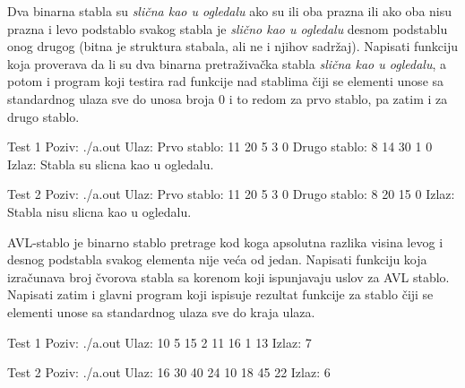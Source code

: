 \begin{Answer}[ref=712]
\end{Answer}



\begin{Exercise}[label=713, difficulty=1]
Dva binarna stabla su {\em slična kao u ogledalu} ako su ili oba prazna ili ako oba nisu prazna i levo podstablo svakog stabla je {\em slično kao u ogledalu} desnom podstablu onog drugog (bitna je struktura stabala, ali ne i njihov sadržaj). Napisati funkciju koja proverava da li su dva binarna pretraživačka stabla {\em slična kao u ogledalu}, a potom i program koji testira rad funkcije nad stablima čiji se elementi unose sa standardnog ulaza sve do unosa broja 0 i to redom za prvo stablo, pa zatim i za drugo stablo. 

\begin{miditest}
\begin{test}{Test 1}
Poziv: ./a.out
Ulaz: 
	Prvo stablo: 11 20 5 3 0
	Drugo stablo: 8 14 30 1 0
Izlaz: 
	Stabla su slicna kao u ogledalu.
\end{test}
\end{miditest}

\begin{miditest}
\begin{test}{Test 2}
Poziv: ./a.out
Ulaz: 
	Prvo stablo: 11 20 5 3 0
	Drugo stablo: 8 20 15 0
Izlaz: 
	Stabla nisu slicna kao u ogledalu.
\end{test}
\end{miditest}
\end{Exercise}

\begin{Answer}[ref=713]
\end{Answer}


\begin{Exercise}[label=714]
AVL-stablo je binarno stablo pretrage kod koga apsolutna razlika visina levog i desnog podstabla svakog elementa
nije veća od jedan. Napisati funkciju  koja izračunava broj čvorova stabla sa korenom  koji ispunjavaju uslov za AVL stablo. Napisati zatim i glavni program koji ispisuje rezultat  funkcije za stablo čiji se elementi unose sa standardnog ulaza sve do kraja ulaza.

\begin{miditest}
\begin{test}{Test 1}
Poziv: ./a.out
Ulaz: 
	10 5 15 2 11 16 1 13
Izlaz: 
	7
\end{test}
\end{miditest}
\begin{miditest}
\begin{test}{Test 2}
Poziv: ./a.out
Ulaz: 
	16 30 40 24 10 18 45 22
Izlaz: 
	6
\end{test}
\end{miditest}
\end{Exercise}

